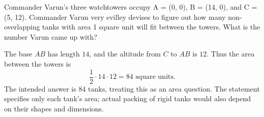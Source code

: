 Commander Varun's three watchtowers occupy A = (0, 0), B = (14, 0), and C = (5, 12). Commander Varun very evilley devises to figure out how many non-overlapping tanks with area 1 square unit will fit between the towers. What is the number Varun came up with?

\begin{solution}
The base $AB$ has length $14$, and the altitude from $C$ to $AB$ is $12$.
Thus the area between the towers is
\[
\boxed{\frac12\cdot14\cdot12=84\text{ square units}}.
\]
The intended answer is $\boxed{84\text{ tanks}}$, treating this as an area
question. The statement specifies only each tank's area; actual packing
of rigid tanks would also depend on their shapes and dimensions.
\end{solution}
